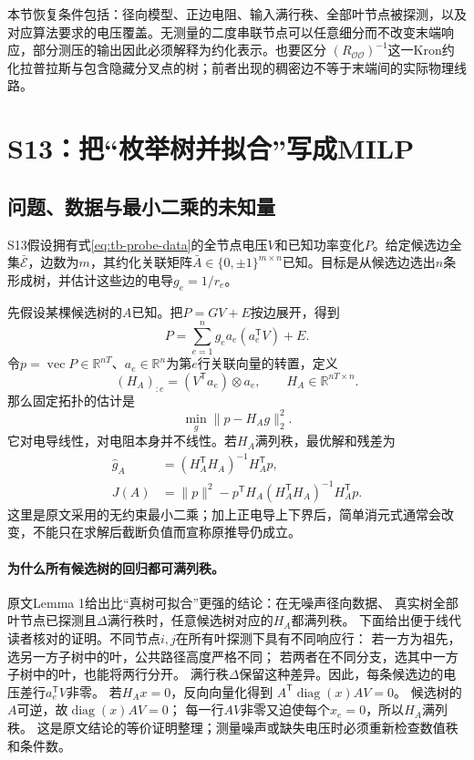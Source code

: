 本节恢复条件包括：径向模型、正边电阻、输入满行秩、全部叶节点被探测，以及对应算法要求的电压覆盖。无测量的二度串联节点可以任意细分而不改变末端响应，部分测压的输出因此必须解释为约化表示。也要区分
$(R_{\mathcal O\mathcal O})^{-1}$这一Kron约化拉普拉斯与包含隐藏分叉点的树；前者出现的稠密边不等于末端间的实际物理线路。

\section{S13：把“枚举树并拟合”写成MILP}
\label{sec:tb-S13}

\subsection{问题、数据与最小二乘的未知量}

S13\citep{S13}假设拥有式\eqref{eq:tb-probe-data}的全节点电压$V$和已知功率变化$P$。给定候选边全集$\bar{\mathcal E}$，边数为$m$，其约化关联矩阵$\bar A\in\{0,\pm1\}^{m\times n}$已知。目标是从候选边选出$n$条形成树，并估计这些边的电导$g_e=1/r_e$。

先假设某棵候选树的$A$已知。把$P=GV+E$按边展开，得到
\[
 P=\sum_{e=1}^n g_ea_e(a_e^{\mathsf T}V)+E.
\]
令$p=\operatorname{vec}P\in\mathbb R^{nT}$、$a_e\in\mathbb R^n$为第$e$行关联向量的转置，定义
\begin{equation}
 (H_A)_{:e}=(V^{\mathsf T}a_e)\otimes a_e,\qquad
 H_A\in\mathbb R^{nT\times n}.
 \label{eq:tb-S13-H}
\end{equation}
那么固定拓扑的估计是
\begin{equation}
 \min_g\|p-H_Ag\|_2^2.
 \label{eq:tb-S13-fixed}
\end{equation}
它对电导线性，对电阻本身并不线性。若$H_A$满列秩，最优解和残差为
\begin{align}
 \widehat g_A&=(H_A^{\mathsf T}H_A)^{-1}H_A^{\mathsf T}p,\\
 J(A)&=\|p\|^2-p^{\mathsf T}H_A(H_A^{\mathsf T}H_A)^{-1}H_A^{\mathsf T}p.
 \label{eq:tb-S13-score}
\end{align}
这里是原文采用的无约束最小二乘；加上正电导上下界后，简单消元式通常会改变，不能只在求解后截断负值而宣称原推导仍成立。


\paragraph{为什么所有候选树的回归都可满列秩。}
原文Lemma 1给出比“真树可拟合”更强的结论：在无噪声径向数据、
真实树全部叶节点已探测且$\Delta$满行秩时，任意候选树对应的$H_A$都满列秩。
下面给出便于线代读者核对的证明。不同节点$i,j$在所有叶探测下具有不同响应行：
若一方为祖先，选另一方子树中的叶，公共路径高度严格不同；
若两者在不同分支，选其中一方子树中的叶，也能将两行分开。
满行秩$\Delta$保留这种差异。因此，每条候选边的电压差行$a_e^{\mathsf T}V$非零。
若$H_Ax=0$，反向向量化得到
$A^{\mathsf T}\operatorname{diag}(x)AV=0$。
候选树的$A$可逆，故$\operatorname{diag}(x)AV=0$；
每一行$AV$非零又迫使每个$x_e=0$，所以$H_A$满列秩。
这是原文结论的等价证明整理；测量噪声或缺失电压时必须重新检查数值秩和条件数。

